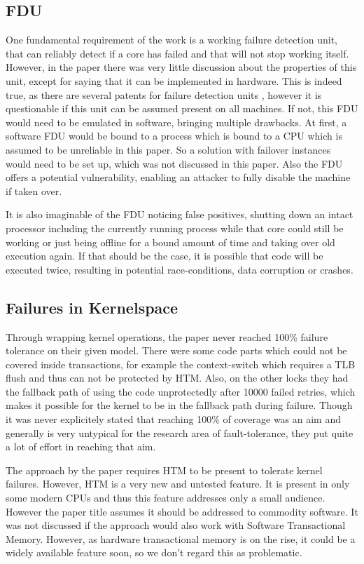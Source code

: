 \documentclass[a4paper,10pt,twoside]{article}
\begin{document}
\subsection{FDU} \label{fdu}
One fundamental requirement of the work is a working failure detection unit, that can reliably detect if a core has failed and that will not stop working itself. However, in the paper there was very little discussion about the properties of this unit, except for saying that it can be implemented in hardware. This is indeed true, as there are several patents for failure detection units \cite{IBMFDU} \cite{FujitsuFDU}, however it is questionable if this unit can be assumed present on all machines. If not, this FDU would need to be emulated in software, bringing multiple drawbacks. At first, a software FDU would be bound to a process which is bound to a CPU which is assumed to be unreliable in this paper. So a solution with failover instances would need to be set up, which was not discussed in this paper. Also the FDU offers a potential vulnerability, enabling an attacker to fully disable the machine if taken over.

It is also imaginable of the FDU noticing false positives, shutting down an intact processor including the currently running process while that core could still be working or just being offline for a bound amount of time and taking over old execution again. If that should be the case, it is possible that code will be executed twice, resulting in potential race-conditions, data corruption or crashes.

\subsection{Failures in Kernelspace}
Through wrapping kernel operations, the paper never reached 100\% failure tolerance on their given model. There were some code parts which could not be covered inside transactions, for example the context-switch which requires a TLB flush and thus can not be protected by HTM. Also, on the other locks they had the fallback path of using the code unprotectedly after 10000 failed retries, which makes it possible for the kernel to be in the fallback path during failure. Though it was never explicitely stated that reaching 100\% of coverage was an aim and generally is very untypical for the research area of fault-tolerance, they put quite a lot of effort in reaching that aim.

The approach by the paper requires HTM to be present to tolerate kernel failures. However, HTM is a very new and untested %
feature. It is present in only some modern CPUs and thus this feature addresses only a small audience. However the paper title assumes it should be addressed to commodity software. It was not discussed if the approach would also work with Software Transactional Memory. However, as hardware transactional memory is on the rise, it could be a widely available feature soon, so we don't regard this as problematic.
\end{document}
